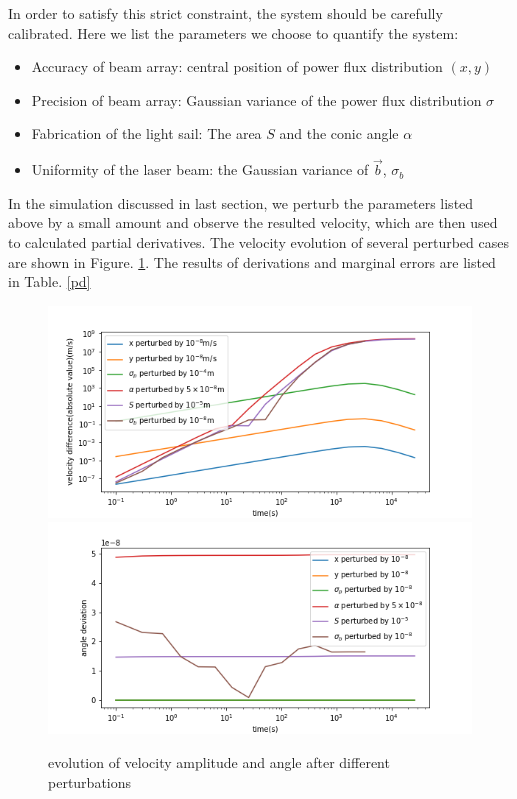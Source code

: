 \documentclass{article}
\begin{document}
	In order to satisfy this strict constraint, the system should be carefully calibrated. Here we list the parameters we choose to quantify the system:
	\begin{itemize}
		\item Accuracy of beam array: central position of power flux distribution $(x, y)$
		\item Precision of beam array: Gaussian variance of the power flux distribution $\sigma$
		\item Fabrication of the light sail: The area $S$ and the conic angle $\alpha$
		\item Uniformity of the laser beam: the Gaussian variance of $\vec{b}$, $\sigma_b$
	\end{itemize}
	
	In the simulation discussed in last section, we perturb the parameters listed above by a small amount and observe the resulted velocity, which are then used to calculated partial derivatives. The velocity evolution of several perturbed cases are shown in Figure. \ref{pert}. The results of derivations and marginal errors are listed in Table. \ref{pd}
	
	\begin{figure}[]
		\centering
		\includegraphics[width=12cm]{pert.png}
		\includegraphics[width=12cm]{pertang.png}
		
		\caption{evolution of velocity amplitude and angle  after different perturbations}
		\label{pert}
	\end{figure}
	
\end{document}
